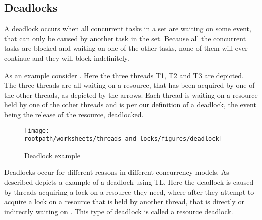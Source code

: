 \subsection{Deadlocks}
A deadlock occurs when all concurrent tasks in a set are waiting on some event, that can only be caused by another task in the set\cite[p. 435]{tanenbaum2008modern}. Because all the concurrent tasks are blocked and waiting on one of the other tasks, none of them will ever continue and they will block indefinitely.

As an example consider . Here the three threads T1, T2 and T3 are depicted. The three threads are all waiting on a resource, that has been acquired by one of the other threads, as depicted by the arrows. Each thread is waiting on a resource held by one of the other threads and is per our definition of a deadlock, the event being the release of the resource, deadlocked.
\begin{figure}[htbp]
\centering
 \texttt{[image: \\rootpath/worksheets/threads\_and\_locks/figures/deadlock]} 
 \caption{Deadlock example}
\label{fig:deadlockexample}
\end{figure}

Deadlocks occur for different reasons in different concurrency models. As described  depicts a example of a deadlock using \ac{TL}. Here the deadlock is caused by threads acquiring a lock on a resource they need, where after they attempt to acquire a lock on a resource that is held by another thread, that is directly or indirectly waiting on . This type of deadlock is called a resource deadlock\cite[p. 435]{tanenbaum2008modern}. 


